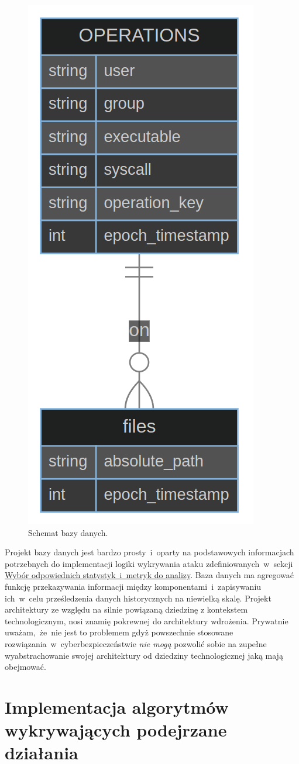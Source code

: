 \begin{figure}[H]
    \centering
    \includegraphics[width=0.3\linewidth]{rysunki/db.png}
    \caption{Schemat bazy danych.}
    \label{fig:enter-label}
\end{figure}
Projekt bazy danych jest bardzo prosty~i~oparty na podstawowych informacjach potrzebnych do implementacji logiki wykrywania ataku zdefiniowanych~w~sekcji \hyperref[sec:wybor]{Wybór odpowiednich statystyk~i~metryk do analizy}. Baza danych ma agregować funkcję przekazywania informacji między komponentami~i~zapisywaniu ich~w~celu prześledzenia danych historycznych na niewielką skalę.
\newline
Projekt architektury ze względu na silnie powiązaną dziedzinę z kontekstem technologicznym, nosi znamię pokrewnej do architektury wdrożenia. Prywatnie uważam,~że~nie jest to problemem gdyż powszechnie stosowane rozwiązania~w~cyberbezpieczeństwie \emph{nie mogą} pozwolić sobie na zupełne wyabstrachowanie swojej architektury od dziedziny technologicznej jaką mają obejmować. 
\section{Implementacja algorytmów wykrywających podejrzane działania}
